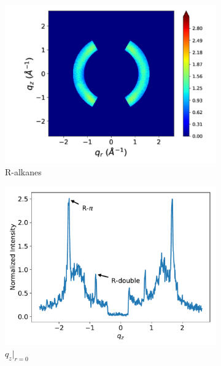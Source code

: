 \documentclass[journal=jpcbfk,manuscript=article]{achemso}
\begin{document}
  \begin{figure}[!htb]
  \centering
  \begin{subfigure}{0.45\linewidth}
  \centering
  \includegraphics[width=\textwidth]{ralkanes.pdf}  %
  \caption{R-alkanes}\label{fig:ralkanes}
  \end{subfigure}
  \begin{subfigure}{0.45\linewidth}
  \centering
  \includegraphics[width=\textwidth]{rpi_rdouble.pdf}  %
  \caption{$q_z|_{r=0}$}\label{fig:rpi_rdouble}
  \end{subfigure}
  \begin{subfigure}{0.45\linewidth}

\end{subfigure}
\end{figure}
\end{document}
